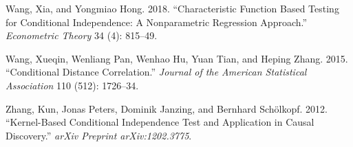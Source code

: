 \documentclass[
  12pt,
  letterpaper]{article}
\newlength{\cslhangindent}
\newenvironment{cslreferences}%
  {\setlength{\parindent}{0pt}%
  \everypar{\setlength{\hangindent}{\cslhangindent}}\ignorespaces}%
  {\par}
\theoremstyle{definition}
\theoremstyle{definition}
\theoremstyle{definition}
\theoremstyle{remark}
\begin{document}
\begin{cslreferences}
\leavevmode\hypertarget{ref-wang2017characteristic}{}%
Wang, Xia, and Yongmiao Hong. 2018. ``Characteristic Function Based Testing for Conditional Independence: A Nonparametric Regression Approach.'' \emph{Econometric Theory} 34 (4): 815--49.

\leavevmode\hypertarget{ref-wang2015conditional}{}%
Wang, Xueqin, Wenliang Pan, Wenhao Hu, Yuan Tian, and Heping Zhang. 2015. ``Conditional Distance Correlation.'' \emph{Journal of the American Statistical Association} 110 (512): 1726--34.

\leavevmode\hypertarget{ref-zhang2012kernel}{}%
Zhang, Kun, Jonas Peters, Dominik Janzing, and Bernhard Schölkopf. 2012. ``Kernel-Based Conditional Independence Test and Application in Causal Discovery.'' \emph{arXiv Preprint arXiv:1202.3775}.
\end{cslreferences}
\end{document}
